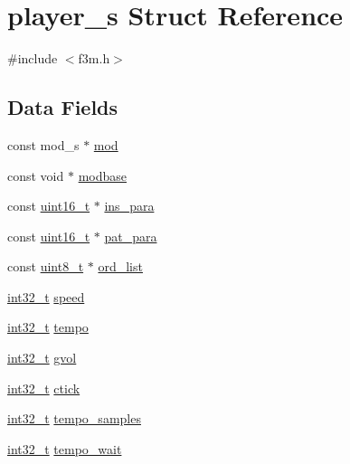 \hypertarget{structplayer__s}{}\section{player\+\_\+s Struct Reference}
\label{structplayer__s}


{\ttfamily \#include $<$f3m.\+h$>$}

\subsection*{Data Fields}
\begin{DoxyCompactItemize}
\item 
const mod\+\_\+s $\ast$ \hyperlink{structplayer__s_a70b8ab05f506f809cd9afc99200d5ba0}{mod}
\item 
const void $\ast$ \hyperlink{structplayer__s_a1fbc958f686741b23d2eab2ab25deb9f}{modbase}
\item 
const \hyperlink{inttypes_8h_a273cf69d639a59973b6019625df33e30}{uint16\+\_\+t} $\ast$ \hyperlink{structplayer__s_aa957f107f32e90b5718fb1b82630575f}{ins\+\_\+para}
\item 
const \hyperlink{inttypes_8h_a273cf69d639a59973b6019625df33e30}{uint16\+\_\+t} $\ast$ \hyperlink{structplayer__s_a569ee260a2aa80ad84e74e93fd1364c1}{pat\+\_\+para}
\item 
const \hyperlink{inttypes_8h_aba7bc1797add20fe3efdf37ced1182c5}{uint8\+\_\+t} $\ast$ \hyperlink{structplayer__s_a75deecd14f03db103975b397780485fd}{ord\+\_\+list}
\item 
\hyperlink{inttypes_8h_a32f2e37ee053cf2ce8ca28d1f74630e5}{int32\+\_\+t} \hyperlink{structplayer__s_a41b1ead3a9ed4ff1ab0f7de7f959ab43}{speed}
\item 
\hyperlink{inttypes_8h_a32f2e37ee053cf2ce8ca28d1f74630e5}{int32\+\_\+t} \hyperlink{structplayer__s_aa8118e22c2625d08681e4b6279a84122}{tempo}
\item 
\hyperlink{inttypes_8h_a32f2e37ee053cf2ce8ca28d1f74630e5}{int32\+\_\+t} \hyperlink{structplayer__s_a83e01a5dee278d4e653d00437ae03c49}{gvol}
\item 
\hyperlink{inttypes_8h_a32f2e37ee053cf2ce8ca28d1f74630e5}{int32\+\_\+t} \hyperlink{structplayer__s_a5b9bc2f980e16b0110b923e8d1f4eb7e}{ctick}
\item 
\hyperlink{inttypes_8h_a32f2e37ee053cf2ce8ca28d1f74630e5}{int32\+\_\+t} \hyperlink{structplayer__s_af8d88f5d106f29fd826b5614e9ef8f60}{tempo\+\_\+samples}
\item 
\hyperlink{inttypes_8h_a32f2e37ee053cf2ce8ca28d1f74630e5}{int32\+\_\+t} \hyperlink{structplayer__s_af8184b71d6f7d93d37f1100cb0eb8727}{tempo\+\_\+wait}

\end{DoxyCompactItemize}

